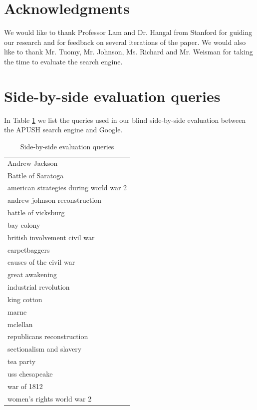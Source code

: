 \documentclass[pdfpagelabels=false,plainpages=true]{acm_proc_article-sp}
\begin{document}
\section{Acknowledgments}

 We would like to thank Professor Lam and Dr. Hangal from Stanford for guiding
 our research and for feedback on several iterations of the paper. We would also
 like to thank Mr. Tuomy, Mr. Johnson, Ms. Richard and Mr. Weisman for taking
 the time to evaluate the search engine.




\appendix
\section{Side-by-side evaluation queries}
\label{app-queries}

In Table \ref{tab-queries} we list the queries used in our blind side-by-side
evaluation between the APUSH search engine and Google.


\begin{table}
\begin{center}
\begin{tabular}{|l|} \hline
Andrew Jackson \\
Battle of Saratoga \\
american strategies during world war 2 \\
andrew johnson reconstruction \\
battle of vicksburg \\
bay colony \\
british involvement civil war \\
carpetbaggers \\
causes of the civil war \\
great awakening \\
industrial revolution \\
king cotton \\
marne \\
mclellan \\
republicans reconstruction \\
sectionalism and slavery \\
tea party \\
uss chesapeake \\
war of 1812 \\
women's rights world war 2 \\
\hline\end{tabular}
\caption{Side-by-side evaluation queries}
\label{tab-queries}
\end{center}
\end{table}
\end{document}
